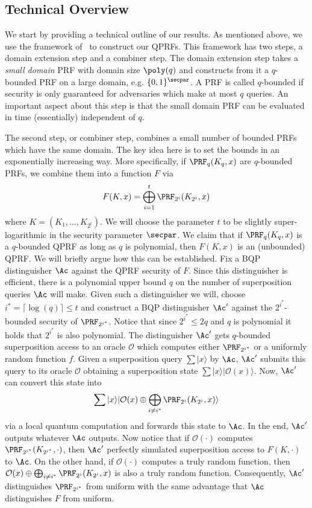 \subsection{Technical Overview}
We start by providing a technical outline of our results. As mentioned above, we use the framework of~ \cite{C:DotSch15} to construct our QPRFs. This framework has two steps, a domain extension step and a combiner step. The domain extension step takes a \emph{small domain} PRF with domain size $\poly(q)$ and constructs from it a $q$-bounded PRF on a large domain, e.g. $\{0,1\}^\secpar$. A PRF is called $q$-bounded if security is only guaranteed for adversaries which make at most $q$ queries. An important aspect about this step is that the small domain PRF can be evaluated in time (essentially) independent of $q$. 

The second step, or combiner step, combines a small number of bounded PRFs which have the same domain. The key idea here is to set the bounds in an exponentially increasing way. More specifically, if $\PRF_q(K_q,x)$ are $q$-bounded PRFs, we combine them into a function $F$ via
\[
F(K,x) = \bigoplus_{i = 1}^t \PRF_{2^i}(K_{2^i},x)
\]
where $K = (K_1,\dots,K_{2^t})$.
We will choose the parameter $t$ to be slightly super-logarithmic in the security parameter $\secpar$. We claim that if $\PRF_q(K_q,x)$ is a $q$-bounded QPRF as long as $q$ is polynomial, then $F(K,x)$ is an (unbounded) QPRF. We will briefly argue how this can be established. Fix a BQP distinguisher $\Ac$ against the QPRF security of $F$. Since this distinguisher is efficient, there is a polynomial upper bound $q$ on the number of superposition queries $\Ac$ will make. Given such a distinguisher we will, choose $i^\ast = \lceil \log(q) \rceil \leq t$ and construct a BQP distinguisher $\Ac'$ against the $2^{i^\ast}$-bounded security of $\PRF_{2^{i^\ast}}$. Notice that since $2^{i^\ast} \leq 2q$ and $q$ is polynomial it holds that $2^{i^\ast}$ is also polynomial. The distinguisher $\Ac'$ gets $q$-bounded superposition access to an oracle $\mathcal{O}$ which computes either $\PRF_{2^{i^\ast}}$ or a uniformly random function $f$. Given a superposition query $\sum |x\rangle$ by $\Ac$, $\Ac'$ submits this query to its oracle $\mathcal{O}$ obtaining a superposition state $\sum |x\rangle |\mathcal{O}(x)\rangle$. Now, $\Ac'$ can convert this state into 
\[
\sum |x\rangle |\mathcal{O}(x) \oplus \bigoplus_{i \neq i^\ast} \PRF_{2^i}(K_{2^i},x) \rangle
\]
 via a local quantum computation and forwards this state to $\Ac$. In the end, $\Ac'$ outputs whatever $\Ac$ outputs. Now notice that if $\mathcal{O}(\cdot)$ computes $\PRF_{2^{i^\ast}}(K_{2^{i^\ast}},\cdot)$, then $\Ac'$ perfectly simulated superposition access to $F(K,\cdot)$ to $\Ac$. On the other hand, if $\mathcal{O}(\cdot)$ computes a truly random function, then $\mathcal{O}(x) \oplus \bigoplus_{i \neq i^\ast} \PRF_{2^i}(K_{2^i},x)$ is also a truly random function. Consequently, $\Ac'$ distinguishes $\PRF_{2^{i^\ast}}$ from uniform with the same advantage that $\Ac$ distinguishes $F$ from uniform.


